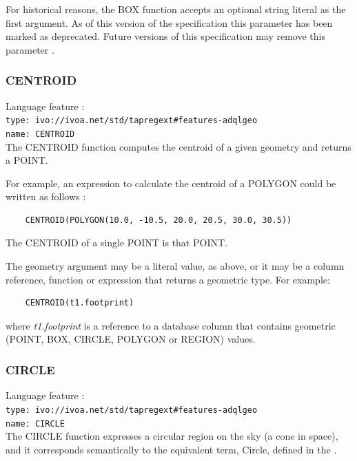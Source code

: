 \documentclass[11pt,a4paper]{ivoa}
\begin{document}
For historical reasons, the BOX function accepts an optional string literal as
the first argument.
As of this version of the specification this parameter has been
marked as deprecated.
Future versions of this specification may remove this parameter
.

\subsubsection{CENTROID}
\label{sec:functions.geom.centroid}
{\footnotesize Language feature :}\\
{\footnotesize \verb|type: ivo://ivoa.net/std/tapregext#features-adqlgeo|}\\
{\footnotesize \verb|name: CENTROID|}\\

The CENTROID function computes the centroid of a given geometry and returns a POINT.

For example, an expression to calculate the centroid of a POLYGON could
be written as follows :
\begin{verbatim}
    CENTROID(POLYGON(10.0, -10.5, 20.0, 20.5, 30.0, 30.5))
\end{verbatim}

The CENTROID of a single POINT is that POINT.

The geometry argument may be a literal value, as above, or it may be a
column reference, function or expression that returns a geometric type.
For example:
\begin{verbatim}
    CENTROID(t1.footprint)
\end{verbatim}
where \textit{t1.footprint} is a reference to a database column that
contains geometric (POINT, BOX, CIRCLE, POLYGON or REGION) values.

\subsubsection{CIRCLE}
\label{sec:functions.geom.circle}
{\footnotesize Language feature :}\\
{\footnotesize \verb|type: ivo://ivoa.net/std/tapregext#features-adqlgeo|}\\
{\footnotesize \verb|name: CIRCLE|}\\

The CIRCLE function expresses a circular region on the sky (a cone in space),
and it corresponds semantically to the equivalent term, Circle, defined in
the \STCSpec{}.
\end{document}
